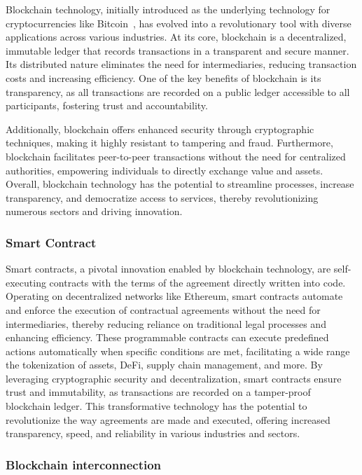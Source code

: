 \documentclass[conference]{IEEEtran}
\begin{document}
Blockchain technology, initially introduced as the underlying technology for cryptocurrencies like Bitcoin~\cite{Nakamoto2008BitcoinPeerToPeer}, has evolved into a revolutionary tool with diverse applications across various industries. At its core, blockchain is a decentralized, immutable ledger that records transactions in a transparent and secure manner. Its distributed nature eliminates the need for intermediaries, reducing transaction costs and increasing efficiency. One of the key benefits of blockchain is its transparency, as all transactions are recorded on a public ledger accessible to all participants, fostering trust and accountability.

Additionally, blockchain offers enhanced security through cryptographic techniques, making it highly resistant to tampering and fraud. Furthermore, blockchain facilitates peer-to-peer transactions without the need for centralized authorities, empowering individuals to directly exchange value and assets. Overall, blockchain technology has the potential to streamline processes, increase transparency, and democratize access to services, thereby revolutionizing numerous sectors and driving innovation.

\subsubsection{Smart Contract}

Smart contracts, a pivotal innovation enabled by blockchain technology, are self-executing contracts with the terms of the agreement directly written into code. Operating on decentralized networks like Ethereum, smart contracts automate and enforce the execution of contractual agreements without the need for intermediaries, thereby reducing reliance on traditional legal processes and enhancing efficiency. These programmable contracts can execute predefined actions automatically when specific conditions are met, facilitating a wide range the tokenization of assets, DeFi, supply chain management, and more. By leveraging cryptographic security and decentralization, smart contracts ensure trust and immutability, as transactions are recorded on a tamper-proof blockchain ledger. This transformative technology has the potential to revolutionize the way agreements are made and executed, offering increased transparency, speed, and reliability in various industries and sectors.

\subsubsection{Blockchain interconnection}
\end{document}
